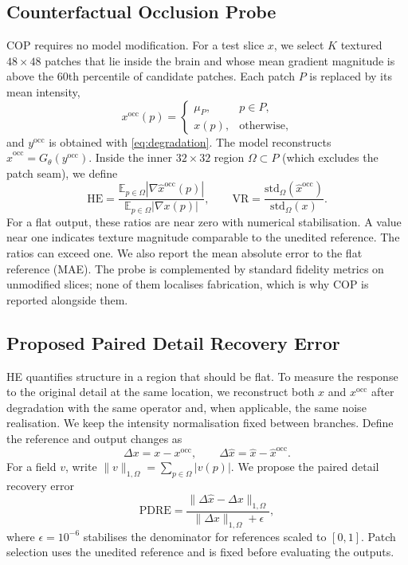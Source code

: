 \documentclass[journal]{IEEEtran}
\begin{document}
\subsection{Counterfactual Occlusion Probe}
COP requires no model modification. For a test slice $x$, we select $K$ textured $48\times48$ patches that lie inside the brain and whose mean gradient magnitude is above the 60th percentile of candidate patches. Each patch $P$ is replaced by its mean intensity,
\begin{equation}
x^{\mathrm{occ}}(p) = \begin{cases}\mu_P, & p\in P,\\ x(p), & \text{otherwise},\end{cases}
\end{equation}
and $y^{\mathrm{occ}}$ is obtained with \eqref{eq:degradation}. The model reconstructs $\hat{x}^{\mathrm{occ}}=G_\theta(y^{\mathrm{occ}})$. Inside the inner $32\times32$ region $\Omega\subset P$ (which excludes the patch seam), we define
\begin{equation}
\mathrm{HE} = \frac{\mathbb{E}_{p\in\Omega}|\nabla \hat{x}^{\mathrm{occ}}(p)|}{\mathbb{E}_{p\in\Omega}|\nabla x(p)|},
\qquad
\mathrm{VR} = \frac{\mathrm{std}_{\Omega}(\hat{x}^{\mathrm{occ}})}{\mathrm{std}_{\Omega}(x)}.
\label{eq:cop}
\end{equation}
For a flat output, these ratios are near zero with numerical stabilisation. A value near one indicates texture magnitude comparable to the unedited reference. The ratios can exceed one. We also report the mean absolute error to the flat reference (MAE). The probe is complemented by standard fidelity metrics on unmodified slices; none of them localises fabrication, which is why COP is reported alongside them.

\subsection{Proposed Paired Detail Recovery Error}
\label{sec:paired-metric}
HE quantifies structure in a region that should be flat. To measure the response to the original detail at the same location, we reconstruct both $x$ and $x^{\mathrm{occ}}$ after degradation with the same operator and, when applicable, the same noise realisation. We keep the intensity normalisation fixed between branches. Define the reference and output changes as
\begin{equation}
\Delta x = x-x^{\mathrm{occ}},\qquad
\Delta\hat{x} = \hat{x}-\hat{x}^{\mathrm{occ}}.
\end{equation}
For a field $v$, write $\|v\|_{1,\Omega}=\sum_{p\in\Omega}|v(p)|$. We propose the paired detail recovery error
\begin{equation}
\mathrm{PDRE} =
\frac{\|\Delta\hat{x}-\Delta x\|_{1,\Omega}}
     {\|\Delta x\|_{1,\Omega}+\epsilon},
\label{eq:pdre}
\end{equation}
where $\epsilon=10^{-6}$ stabilises the denominator for references scaled to $[0,1]$. Patch selection uses the unedited reference and is fixed before evaluating the outputs.
\end{document}
